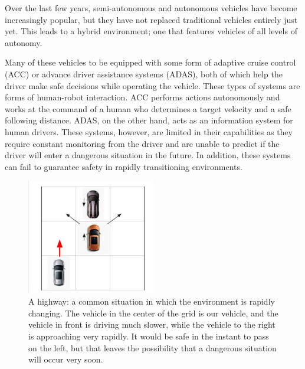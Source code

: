 \documentclass[conference]{IEEEtran}
\begin{document}
    Over the last few years, semi-autonomous and autonomous vehicles have become increasingly popular, but they have not replaced traditional vehicles entirely just yet. This leads to a hybrid environment; one that features vehicles of all levels of autonomy.
    
    Many of these vehicles to be equipped with some form of adaptive cruise control (ACC) or advance driver assistance systems (ADAS), both of which help the driver make safe decisions while operating the vehicle. These types of systems are forms of human-robot interaction. ACC performs actions autonomously and works at the command of a human who determines a target velocity and a safe following distance. ADAS, on the other hand, acts as an information system for human drivers. These systems, however, are limited in their capabilities as they require constant monitoring from the driver and are unable to predict if the driver will enter a dangerous situation in the future. In addition, these systems can fail to guarantee safety in rapidly transitioning environments.
    

\begin{figure}[ht]
    \includegraphics[width=0.5\textwidth]{highwaysit.JPG}
    \caption{A highway: a common situation in which the environment is rapidly changing. The vehicle in the center of the grid is our vehicle, and the vehicle in front is driving much slower, while the vehicle to the right is approaching very rapidly. It would be safe in the instant to pass on the left, but that leaves the possibility that a dangerous situation will occur very soon.}
    \label{fig:hiway}
\end{figure}
    
\end{document}
